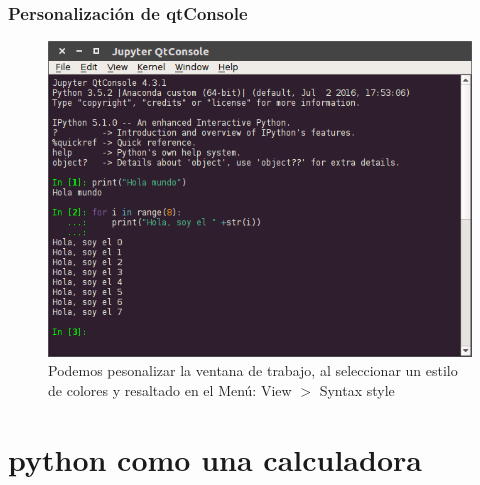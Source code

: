 \documentclass[12pt]{beamer}
\begin{document}
{\begin{frame}
\frametitle{Personalización de qtConsole}
\begin{figure}
	\centering
	\includegraphics[scale=0.35]{Figuras/qtConsole_02.png}
	\caption{Podemos pesonalizar la ventana de trabajo, al seleccionar un estilo de colores y resaltado en el Menú: View $>$ Syntax style}
\end{figure}
\end{frame}
\section{python como una calculadora}
}
\end{document}
